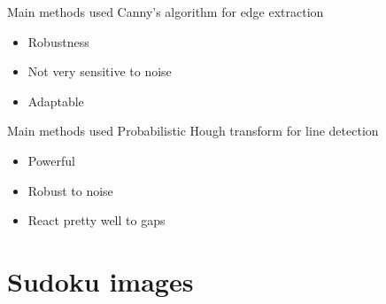 \documentclass[12pt]{beamer}
\begin{document}
\begin{frame}{Main methods used}
    Canny's algorithm for \alert{edge extraction}
    \begin{itemize}
        \item Robustness
        \item Not very sensitive to noise
        \item Adaptable
    \end{itemize}
\end{frame}

\begin{frame}{Main methods used}
    Probabilistic Hough transform for \alert{line detection}
    \begin{itemize}
        \item Powerful
        \item Robust to noise
        \item React pretty well to gaps
    \end{itemize}
\end{frame}

\section{Sudoku images}
\end{document}
